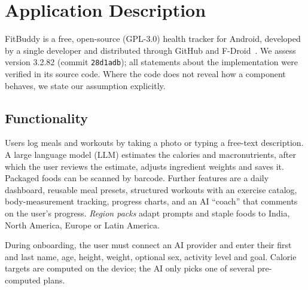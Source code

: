 
\section{Application Description}
\label{sec:application}

FitBuddy is a free, open-source (GPL-3.0) health tracker for Android, developed by a single
developer and distributed through GitHub and F-Droid~\cite{fitbuddy-repo,fitbuddy-fdroid}. We
assess version 3.2.82 (commit \texttt{28d1adb}); all statements about the implementation were
verified in its source code. Where the code does not reveal how a component behaves, we state
our assumption explicitly.

\subsection{Functionality}
Users log meals and workouts by taking a photo or typing a free-text description. A large
language model (LLM) estimates the calories and macronutrients, after which the user reviews the
estimate, adjusts ingredient weights and saves it. Packaged foods can be scanned by barcode.
Further features are a daily dashboard, reusable meal presets, structured workouts with an
exercise catalog, body-measurement tracking, progress charts, and an AI ``coach'' that comments on
the user's progress. \emph{Region packs} adapt prompts and staple foods to India, North America,
Europe or Latin America.

During onboarding, the user must connect an AI provider and enter their first and last name, age,
height, weight, optional sex, activity level and goal. Calorie targets are computed on the
device; the AI only picks one of several pre-computed plans.

